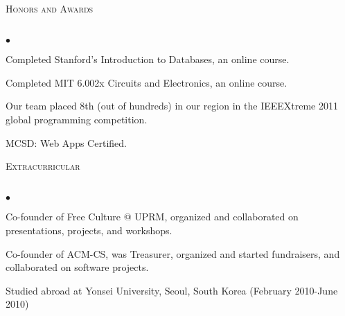 \documentclass{article}
\newcommand{\lineunder}{\vspace*{-8pt} \\ \hspace*{-18pt} \hrulefill \\}
\newcommand{\header}[1]{{\hspace*{-15pt}\vspace*{6pt} \textsc{#1}} \vspace*{-6pt} \lineunder}
\newenvironment{achievements}{\begin{list}{$\bullet$}{\topsep 0pt \itemsep -2pt}}{\vspace*{4pt}\end{list}}
\begin{document}
\header{Honors and Awards}
\begin{achievements}
\item Completed Stanford's Introduction to Databases, an online course.
\item Completed MIT 6.002x Circuits and Electronics, an online course.
\item Our team placed 8th (out of hundreds) in our region in the IEEEXtreme 2011 global programming competition.
\item MCSD: Web Apps Certified.
\end{achievements}


\header{Extracurricular}
\begin{achievements}
\item Co-founder of Free Culture @ UPRM, organized and collaborated on presentations, projects, and workshops.
\item Co-founder of ACM-CS, was Treasurer, organized and started fundraisers, and collaborated on software projects.
\item Studied abroad at Yonsei University, Seoul, South Korea (February 2010-June 2010)
\end{achievements}
\end{document}
